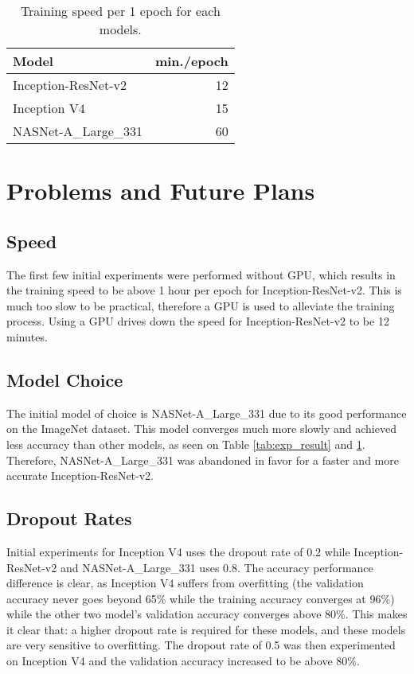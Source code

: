 \documentclass[a4paper]{article}
\begin{document}
\begin{table}
\centering
\begin{tabular}{l|r}
Model & min./epoch \\\hline
Inception-ResNet-v2 \cite{Szegedy2016} & 12 \\
Inception V4 \cite{Szegedy2016} & 15 \\
NASNet-A\_Large\_331 \cite{Zoph2017} & 60 \\
\end{tabular}
\caption{\label{tab:perf}Training speed per 1 epoch for each models.}
\end{table}

\section{Problems and Future Plans}

\subsection{Speed}

The first few initial experiments were performed without GPU, which results in the training speed to be above 1 hour per epoch for Inception-ResNet-v2. This is much too slow to be practical, therefore a GPU is used to alleviate the training process. Using a GPU drives down the speed for Inception-ResNet-v2 to be 12 minutes.

\subsection{Model Choice}

The initial model of choice is NASNet-A\_Large\_331 due to its good performance on the ImageNet dataset. This model converges much more slowly and achieved less accuracy than other models, as seen on Table \ref{tab:exp_result} and \ref{tab:perf}. Therefore, NASNet-A\_Large\_331 was abandoned in favor for a faster and more accurate Inception-ResNet-v2.

\subsection{Dropout Rates}

Initial experiments for Inception V4 uses the dropout rate of 0.2 while Inception-ResNet-v2 and NASNet-A\_Large\_331 uses 0.8. The accuracy performance difference is clear, as Inception V4 suffers from overfitting (the validation accuracy never goes beyond 65\% while the training accuracy converges at 96\%) while the other two model's validation accuracy converges above 80\%. This makes it clear that: a higher dropout rate is required for these models, and these models are very sensitive to overfitting. The dropout rate of 0.5 was then experimented on Inception V4 and the validation accuracy increased to be above 80\%. \\
\end{document}

